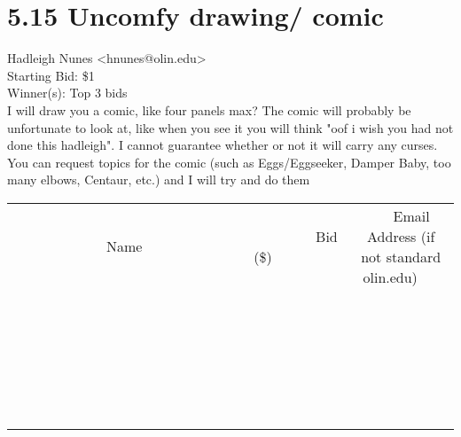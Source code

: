 \documentclass[11pt]{article}
\begin{document}
					\section*{5.15 Uncomfy drawing/ comic}
					Hadleigh Nunes <hnunes@olin.edu> \\
					Starting Bid: \$1 \\
					Winner(s): Top 3 bids \\
					I will draw you a comic, like four panels max? The comic will probably be unfortunate to look at, like when you see it you will think "oof i wish you had not done this hadleigh".  I cannot guarantee whether or not it will carry any curses. You can request  topics for the comic (such as Eggs/Eggseeker, Damper Baby, too many elbows, Centaur, etc.) and I will try and do them \\
					[6ex]
					\begin{tabular}{c c c}
						~~~~~~~~~~~~~Name~~~~~~~~~~~~~ & ~~~~~~~~~Bid (\$)~~~~~~~~~ & ~~~Email Address (if not standard olin.edu)~~~ \\
				
 & & \\
\hline
 & & \\
\hline
 & & \\
\hline
 & & \\
\hline
 & & \\
\hline
 & & \\
\hline
 & & \\
\hline
 & & \\
\hline
 & & \\
\hline
 & & \\
\hline
 & & \\
\hline
 & & \\
\hline
 & & \\
\hline
 & & \\
\hline
 & & \\
\hline
 & & \\
\hline
 & & \\
\hline
 & & \\
\hline
 & & \\
\hline
 & & \\
\hline
 & & \\
\hline
 & & \\
\hline
 & & \\
\hline
 & & \\
\hline
 & & \\
\hline
 & & \\
\hline
					\end{tabular}
					\clearpage
				
\end{document}
